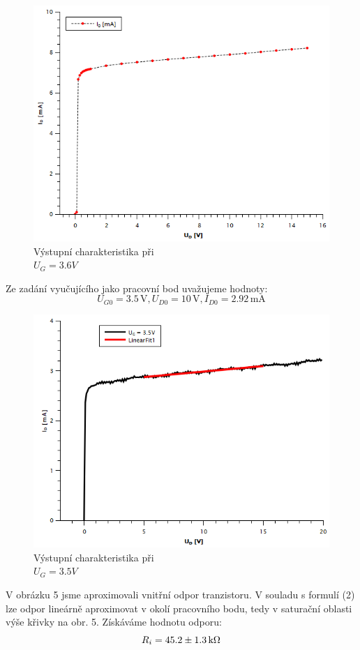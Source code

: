 \documentclass[czech,11pt,a4paper]{article}
\begin{document}
\begin{multicols}{2}
\begin{figure}[H]
\begin{center}
			\includegraphics[width=0.8\linewidth, ]{vystup1} 
			\caption{Výstupní charakteristika při \\$U_G = 3.6V$}
			
		\end{center}		
	\end{figure} 
	Ze zadání vyučujícího jako pracovní bod uvažujeme hodnoty:
	\begin{equation}
		U_{G0} = 3.5\,\mathrm{V}, U_{D0} = 10\,\mathrm{V}, I_{D0} = 2.92\,\mathrm{mA}
	\end{equation}
	\begin{figure}[H]
		\begin{center}			
			\includegraphics[width=0.8\linewidth, ]{linearfitodpor} 
			\caption{Výstupní charakteristika při \\$U_G = 3.5V$}
			
		\end{center}		
	\end{figure} 
	V obrázku 5 jsme aproximovali vnitřní odpor tranzistoru. V souladu s formulí (2) lze odpor lineárně aproximovat v okolí pracovního bodu, tedy v saturační oblasti výše křivky na obr. 5. Získáváme hodnotu odporu:
	\begin{equation*}
		R_i = 45.2\pm 1.3\,\rm k\Omega
	\end{equation*}
	

\end{multicols}
\end{document}
